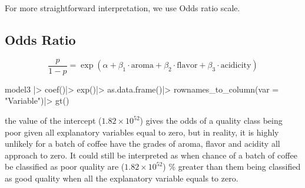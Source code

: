 \documentclass[
  letterpaper,
  DIV=11,
  numbers=noendperiod]{scrartcl}
\newenvironment{Shaded}{\begin{snugshade}}{\end{snugshade}}
\newcommand{\AttributeTok}[1]{\textcolor[rgb]{0.40,0.45,0.13}{#1}}
\newcommand{\FunctionTok}[1]{\textcolor[rgb]{0.28,0.35,0.67}{#1}}
\newcommand{\NormalTok}[1]{\textcolor[rgb]{0.00,0.23,0.31}{#1}}
\newcommand{\SpecialCharTok}[1]{\textcolor[rgb]{0.37,0.37,0.37}{#1}}
\newcommand{\StringTok}[1]{\textcolor[rgb]{0.13,0.47,0.30}{#1}}
\begin{document}
For more straightforward interpretation, we use Odds ratio scale.

\subsection{Odds Ratio}\label{odds-ratio}

\[
\frac{p}{1-p} = \exp(\alpha + \beta_1 \cdot \textrm{aroma} +\beta_2 \cdot \textrm{flavor} + \beta_3 \cdot \textrm{acidicity})
\]

\begin{Shaded}
\begin{Highlighting}[]
\NormalTok{model3 }\SpecialCharTok{|\textgreater{}}
  \FunctionTok{coef}\NormalTok{()}\SpecialCharTok{|\textgreater{}}
  \FunctionTok{exp}\NormalTok{()}\SpecialCharTok{|\textgreater{}}
  \FunctionTok{as.data.frame}\NormalTok{()}\SpecialCharTok{|\textgreater{}}
  \FunctionTok{rownames\_to\_column}\NormalTok{(}\AttributeTok{var =} \StringTok{"Variable"}\NormalTok{)}\SpecialCharTok{|\textgreater{}}
  \FunctionTok{gt}\NormalTok{()}
\end{Highlighting}
\end{Shaded}

\begin{table}

\caption{\label{tbl-summtable}Summary Table on the Odds Scale}


\end{table}%

the value of the intercept (\(1.82\times10^{52}\)) gives the odds of a
quality class being poor given all explanatory variables equal to zero,
but in reality, it is highly unlikely for a batch of coffee have the
grades of aroma, flavor and acidity all approach to zero. It could still
be interpreted as when chance of a batch of coffee be classified as poor
quality are (\(1.82\times10^{52}\)) \% greater than them being
classified as good quality when all the explanatory variable equals to
zero.
\end{document}
